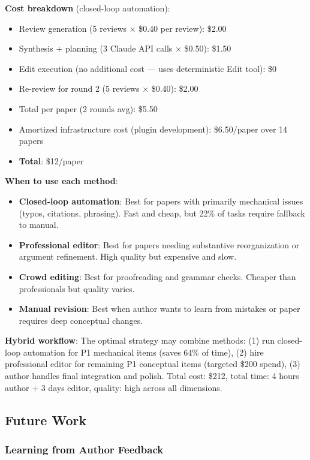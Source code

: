 \textbf{Cost breakdown} (closed-loop automation):
\begin{itemize}
\item Review generation (5 reviews × \$0.40 per review): \$2.00
\item Synthesis + planning (3 Claude API calls × \$0.50): \$1.50
\item Edit execution (no additional cost — uses deterministic Edit tool): \$0
\item Re-review for round 2 (5 reviews × \$0.40): \$2.00
\item Total per paper (2 rounds avg): \$5.50
\item Amortized infrastructure cost (plugin development): \$6.50/paper over 14 papers
\item \textbf{Total}: \$12/paper
\end{itemize}

\textbf{When to use each method}:
\begin{itemize}
\item \textbf{Closed-loop automation}: Best for papers with primarily mechanical issues (typos, citations, phrasing). Fast and cheap, but 22\% of tasks require fallback to manual.
\item \textbf{Professional editor}: Best for papers needing substantive reorganization or argument refinement. High quality but expensive and slow.
\item \textbf{Crowd editing}: Best for proofreading and grammar checks. Cheaper than professionals but quality varies.
\item \textbf{Manual revision}: Best when author wants to learn from mistakes or paper requires deep conceptual changes.
\end{itemize}

\textbf{Hybrid workflow}: The optimal strategy may combine methods: (1) run closed-loop automation for P1 mechanical items (saves 64\% of time), (2) hire professional editor for remaining P1 conceptual items (targeted \$200 spend), (3) author handles final integration and polish. Total cost: \$212, total time: 4 hours author + 3 days editor, quality: high across all dimensions.

\subsection{Future Work}

\subsubsection{Learning from Author Feedback}

